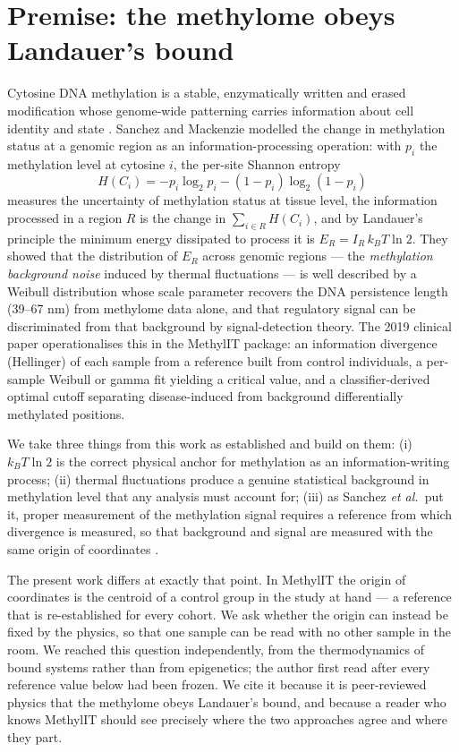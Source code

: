 \documentclass[12pt,a4paper]{article}
\begin{document}
\section{Premise: the methylome obeys Landauer's bound}
\label{sec:premise}

Cytosine DNA methylation is a stable, enzymatically written and erased modification whose genome-wide patterning carries information about cell identity and state \citep{sanchez2016}. Sanchez and Mackenzie \citep{sanchez2016} modelled the change in methylation status at a genomic region as an information-processing operation: with $p_i$ the methylation level at cytosine $i$, the per-site Shannon entropy
\begin{equation}
H(C_i) = -p_i\log_2 p_i - (1-p_i)\log_2(1-p_i)
\label{eq:H}
\end{equation}
measures the uncertainty of methylation status at tissue level, the information processed in a region $R$ is the change in $\sum_{i\in R} H(C_i)$, and by Landauer's principle the minimum energy dissipated to process it is $E_R = I_R\,k_B T\ln 2$. They showed that the distribution of $E_R$ across genomic regions --- the \emph{methylation background noise} induced by thermal fluctuations --- is well described by a Weibull distribution whose scale parameter recovers the DNA persistence length (39--67 nm) from methylome data alone, and that regulatory signal can be discriminated from that background by signal-detection theory. The 2019 clinical paper \citep{sanchez2019} operationalises this in the MethylIT package: an information divergence (Hellinger) of each sample from a reference built from control individuals, a per-sample Weibull or gamma fit yielding a critical value, and a classifier-derived optimal cutoff separating disease-induced from background differentially methylated positions.

We take three things from this work as established and build on them: (i) $k_B T\ln 2$ is the correct physical anchor for methylation as an information-writing process; (ii) thermal fluctuations produce a genuine statistical background in methylation level that any analysis must account for; (iii) as Sanchez \emph{et al.}\ put it, proper measurement of the methylation signal requires a reference from which divergence is measured, so that background and signal are measured with the same origin of coordinates \citep{sanchez2019}.

The present work differs at exactly that point. In MethylIT the origin of coordinates is the centroid of a control group in the study at hand --- a reference that is re-established for every cohort. We ask whether the origin can instead be fixed by the physics, so that one sample can be read with no other sample in the room. We reached this question independently, from the thermodynamics of bound systems rather than from epigenetics; the author first read \citep{sanchez2016} after every reference value below had been frozen. We cite it because it is peer-reviewed physics that the methylome obeys Landauer's bound, and because a reader who knows MethylIT should see precisely where the two approaches agree and where they part.
\end{document}
